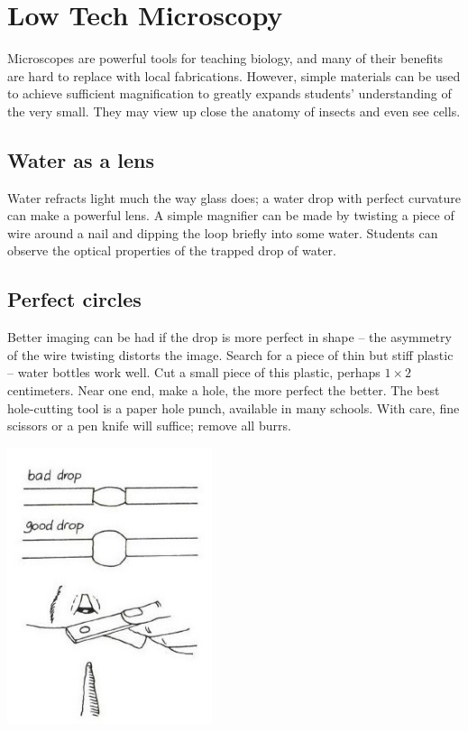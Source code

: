 \chapter{Low Tech Microscopy} 
\label{cha:microscopy}

\begin{multicols}{2}

Microscopes are powerful tools for teaching biology, and many of their benefits are hard to replace with local fabrications. However, simple materials can be used to achieve sufficient magnification to greatly expands students' understanding of the very small. They may view up close the anatomy of insects and even see cells.

\section{Water as a lens}
Water refracts light much the way glass does; a water drop with perfect curvature can make a powerful lens. A simple magnifier can be made by twisting a piece of wire around a nail and dipping the loop briefly into some water. Students can observe the optical properties of the trapped drop of water.

\section{Perfect circles}
Better imaging can be had if the drop is more perfect in shape -- the asymmetry of the wire twisting distorts the image. Search for a piece of thin but stiff plastic -- water bottles work well. Cut a small piece of this plastic, perhaps $1 \times 2$ centimeters. Near one end, make a hole, the more perfect the better. The best hole-cutting tool is a paper hole punch, available in many schools. With care, fine scissors or a pen knife will suffice; remove all burrs.
\begin{center}
\includegraphics[width=0.45\textwidth]{./img/vso/water-drop-2.jpg}
\end{center}


\end{multicols}
